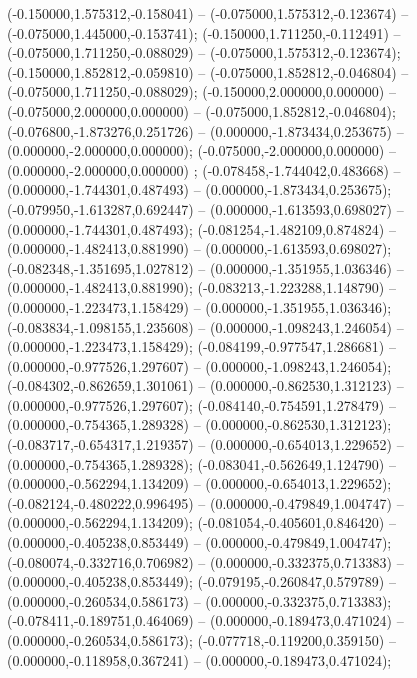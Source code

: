  (-0.150000,1.575312,-0.158041) -- (-0.075000,1.575312,-0.123674) -- (-0.075000,1.445000,-0.153741);
 (-0.150000,1.711250,-0.112491) -- (-0.075000,1.711250,-0.088029) -- (-0.075000,1.575312,-0.123674);
 (-0.150000,1.852812,-0.059810) -- (-0.075000,1.852812,-0.046804) -- (-0.075000,1.711250,-0.088029);
 (-0.150000,2.000000,0.000000) -- (-0.075000,2.000000,0.000000) -- (-0.075000,1.852812,-0.046804);
 (-0.076800,-1.873276,0.251726) -- (0.000000,-1.873434,0.253675) -- (0.000000,-2.000000,0.000000);
 (-0.075000,-2.000000,0.000000) -- (0.000000,-2.000000,0.000000) ;
 (-0.078458,-1.744042,0.483668) -- (0.000000,-1.744301,0.487493) -- (0.000000,-1.873434,0.253675);
 (-0.079950,-1.613287,0.692447) -- (0.000000,-1.613593,0.698027) -- (0.000000,-1.744301,0.487493);
 (-0.081254,-1.482109,0.874824) -- (0.000000,-1.482413,0.881990) -- (0.000000,-1.613593,0.698027);
 (-0.082348,-1.351695,1.027812) -- (0.000000,-1.351955,1.036346) -- (0.000000,-1.482413,0.881990);
 (-0.083213,-1.223288,1.148790) -- (0.000000,-1.223473,1.158429) -- (0.000000,-1.351955,1.036346);
 (-0.083834,-1.098155,1.235608) -- (0.000000,-1.098243,1.246054) -- (0.000000,-1.223473,1.158429);
 (-0.084199,-0.977547,1.286681) -- (0.000000,-0.977526,1.297607) -- (0.000000,-1.098243,1.246054);
 (-0.084302,-0.862659,1.301061) -- (0.000000,-0.862530,1.312123) -- (0.000000,-0.977526,1.297607);
 (-0.084140,-0.754591,1.278479) -- (0.000000,-0.754365,1.289328) -- (0.000000,-0.862530,1.312123);
 (-0.083717,-0.654317,1.219357) -- (0.000000,-0.654013,1.229652) -- (0.000000,-0.754365,1.289328);
 (-0.083041,-0.562649,1.124790) -- (0.000000,-0.562294,1.134209) -- (0.000000,-0.654013,1.229652);
 (-0.082124,-0.480222,0.996495) -- (0.000000,-0.479849,1.004747) -- (0.000000,-0.562294,1.134209);
 (-0.081054,-0.405601,0.846420) -- (0.000000,-0.405238,0.853449) -- (0.000000,-0.479849,1.004747);
 (-0.080074,-0.332716,0.706982) -- (0.000000,-0.332375,0.713383) -- (0.000000,-0.405238,0.853449);
 (-0.079195,-0.260847,0.579789) -- (0.000000,-0.260534,0.586173) -- (0.000000,-0.332375,0.713383);
 (-0.078411,-0.189751,0.464069) -- (0.000000,-0.189473,0.471024) -- (0.000000,-0.260534,0.586173);
 (-0.077718,-0.119200,0.359150) -- (0.000000,-0.118958,0.367241) -- (0.000000,-0.189473,0.471024);
